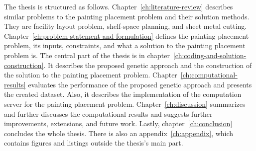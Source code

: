 The thesis is structured as follows.
Chapter~\ref{ch:literature-review} describes similar problems to the painting placement problem and their solution methods.
They are facility layout problem, shelf-space planning, and sheet metal cutting.
Chapter~\ref{ch:problem-statement-and-formulation} defines the painting placement problem, its inputs, constraints, and what a solution to the painting placement problem is.
The central part of the thesis is in chapter~\ref{ch:coding-and-solution-construction}.
It describes the proposed genetic approach and the construction of the solution to the painting placement problem.
Chapter~\ref{ch:computational-results} evaluates the performance of the proposed genetic approach
and presents the created dataset.
Also, it describes the implementation of the computation server for the painting placement problem.
Chapter~\ref{ch:discussion} summarizes and further discusses the computational results and suggests further improvements, extensions, and future work.
Lastly, chapter~\ref{ch:conclusion} concludes the whole thesis.
There is also an appendix~\ref{ch:appendix}, which contains figures and listings outside the thesis's main part.
